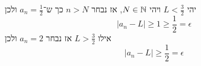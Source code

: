 



יהי $L < \frac{3}{2}$ ויהי $N \in \mathbb{N}$, אז נבחר $n > N$ כך ש־$a_n = \frac{1}{2}$ ולכן
\[
	|a_n - L| \ge 1 \ge \frac{1}{2} = \epsilon
\]
אילו $L > \frac{3}{2}$ אז נבחר $a_n = 2$ ולכן
\[
	|a_n - L| \ge \frac{1}{2} = \epsilon
\]


